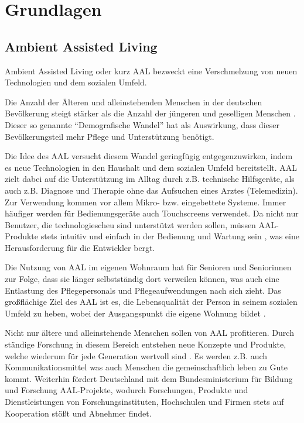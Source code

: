 \chapter{Grundlagen}

\section{Ambient Assisted Living}

Ambient Assisted Living oder kurz AAL bezweckt eine Verschmelzung von neuen Technologien und
dem sozialen Umfeld.

Die Anzahl der Älteren und alleinstehenden Menschen in der deutschen Bevölkerung steigt stärker
als die Anzahl der jüngeren und geselligen Menschen \cite{aaldeu}.
Dieser so genannte ``Demografische Wandel'' hat als Auswirkung, dass dieser Bevölkerungsteil
mehr Pflege und Unterstützung benötigt.

Die Idee des AAL versucht diesem Wandel geringfügig entgegenzuwirken, indem es neue Technologien
in den Haushalt und dem sozialen Umfeld bereitstellt.
AAL zielt dabei auf die Unterstützung im Alltag durch z.B. technische Hilfsgeräte, als auch
z.B. Diagnose und Therapie ohne das Aufsuchen eines Arztes (Telemedizin).
Zur Verwendung kommen vor allem Mikro- bzw. eingebettete Systeme.
Immer häufiger werden für Bedienungsgeräte auch Touchscreens verwendet.
Da nicht nur Benutzer, die technologiescheu sind unterstützt werden sollen, müssen AAL-Produkte
stets intuitiv und einfach in der Bedienung und Wartung sein \cite{aaldeu}, was eine Herausforderung für
die Entwickler bergt.

Die Nutzung von AAL im eigenen Wohnraum hat für Senioren und Seniorinnen zur Folge, dass sie
länger selbstständig dort verweilen können, was auch eine Entlastung des Pflegepersonals und
Pflegeaufwendungen nach sich zieht.
Das großflächige Ziel des AAL ist es, die Lebensqualität der Person in seinem sozialen Umfeld zu heben,
wobei der Ausgangspunkt die eigene Wohnung bildet \cite{aaldeu}.

Nicht nur ältere und alleinstehende Menschen sollen von AAL profitieren.
Durch ständige Forschung in diesem Bereich entstehen neue Konzepte und Produkte, welche wiederum
für jede Generation wertvoll sind \cite{mtidw}.
Es werden z.B. auch Kommunikationsmittel was auch Menschen die gemeinschaftlich leben zu Gute kommt.
Weiterhin fördert Deutschland mit dem Bundesministerium für Bildung und Forschung AAL-Projekte,
wodurch Forschungen, Produkte und Dienstleistungen von Forschungsinstituten, Hochschulen und Firmen
stets auf Kooperation stößt und Abnehmer findet.

